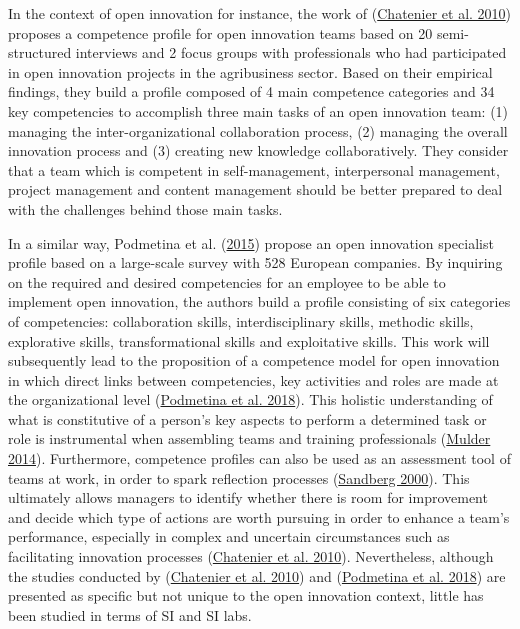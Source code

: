 \documentclass[AMA,STIX1COL,APA,STIX2COL]{WileyNJD-v2}
\begin{document}
In the context of open innovation for instance, the work of
(\protect\hyperlink{ref-Chatenier2010}{Chatenier et al. 2010}) proposes
a competence profile for open innovation teams based on 20
semi-structured interviews and 2 focus groups with professionals who had
participated in open innovation projects in the agribusiness sector.
Based on their empirical findings, they build a profile composed of 4
main competence categories and 34 key competencies to accomplish three
main tasks of an open innovation team: (1) managing the
inter-organizational collaboration process, (2) managing the overall
innovation process and (3) creating new knowledge collaboratively. They
consider that a team which is competent in self-management,
interpersonal management, project management and content management
should be better prepared to deal with the challenges behind those main
tasks.

In a similar way, Podmetina et al.
(\protect\hyperlink{ref-Podmetina2015}{2015}) propose an open innovation
specialist profile based on a large-scale survey with 528 European
companies. By inquiring on the required and desired competencies for an
employee to be able to implement open innovation, the authors build a
profile consisting of six categories of competencies: collaboration
skills, interdisciplinary skills, methodic skills, explorative skills,
transformational skills and exploitative skills. This work will
subsequently lead to the proposition of a competence model for open
innovation in which direct links between competencies, key activities
and roles are made at the organizational level
(\protect\hyperlink{ref-Podmetina2018}{Podmetina et al. 2018}). This
holistic understanding of what is constitutive of a person's key aspects
to perform a determined task or role is instrumental when assembling
teams and training professionals
(\protect\hyperlink{ref-Mulder2014}{Mulder 2014}). Furthermore,
competence profiles can also be used as an assessment tool of teams at
work, in order to spark reflection processes
(\protect\hyperlink{ref-Sandberg2000}{Sandberg 2000}). This ultimately
allows managers to identify whether there is room for improvement and
decide which type of actions are worth pursuing in order to enhance a
team's performance, especially in complex and uncertain circumstances
such as facilitating innovation processes
(\protect\hyperlink{ref-Chatenier2010}{Chatenier et al. 2010}).
Nevertheless, although the studies conducted by
(\protect\hyperlink{ref-Chatenier2010}{Chatenier et al. 2010}) and
(\protect\hyperlink{ref-Podmetina2018}{Podmetina et al. 2018}) are
presented as specific but not unique to the open innovation context,
little has been studied in terms of SI and SI labs.
\end{document}
